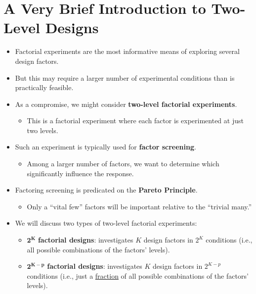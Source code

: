 \section*{A Very Brief Introduction to Two-Level Designs}
\begin{itemize}
      \item Factorial experiments are the most informative means of exploring several design factors.
      \item But this may require a larger number of experimental conditions than is practically feasible.
      \item As a compromise, we might consider \textbf{two-level factorial experiments}.
            \begin{itemize}
                  \item This is a factorial experiment where each factor is experimented at just two levels.
            \end{itemize}
      \item Such an experiment is typically used for \textbf{factor screening}.
            \begin{itemize}
                  \item Among a larger number of factors, we want to determine which significantly influence the response.
            \end{itemize}
      \item Factoring screening is predicated on the \textbf{Pareto Principle}.
            \begin{itemize}
                  \item Only a ``vital few'' factors will be important relative to the ``trivial many.''
            \end{itemize}
      \item We will discuss two types of two-level factorial experiments:
            \begin{itemize}
                  \item $ \symbf{2^K} $ \textbf{factorial designs}: investigates $ K $ design factors in $ 2^K $ conditions (i.e., all possible combinations of the factors' levels).
                  \item $ \symbf{2^{K-p}} $ \textbf{factorial designs}: investigates $ K $ design factors in $ 2^{K-p} $ conditions (i.e., just a \underline{fraction} of all possible
                        combinations of the factors' levels).
            \end{itemize}
\end{itemize}
